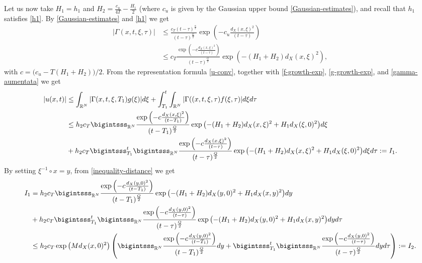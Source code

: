 \documentclass[11pt,a4paper]{article}
\numberwithin{equation}{section}
\def \rn {{\mathbb {R}}^{N}}
\def \a {{\alpha}}
\def \G {{\Gamma}}
\def \t {{\tau}}
\def \x {{\xi}}
\begin{document}
\begin{pf-fundamental}
	
	Let us now take  $H_1=h_1$ and $H_2=\frac{c_u}{4T}-\frac{H_1}{2}$ (where $c_u$ is given by the Gaussian upper bound \eqref{Gaussian-estimates}), and recall that $h_1$ satisfies \eqref{h1}. By \eqref{Gaussian-estimates} and \eqref{h1} we get 
	\begin{equation}\label{gamma-aumentata}
		\begin{aligned}
			|\G(x,t,\x,\t)|&\leq \frac{c_T (t-\tau)^{\frac{\a}{2}}}{(t-\t)^{\frac{Q}{2}}}\exp{\left(-c_u\frac{d_X(x,\x)^2}{(t-\t)}\right)}\\
			&\leq c_T\frac{\exp{\left(-c\frac{d_X(x,\x)^2}{(t-\t)}\right)}}{(t-\t)^{\frac{Q}{2}}}\exp{\left(-(H_1+H_2)d_X(x,\x)^2\right)},
		\end{aligned}
	\end{equation} 
	with $c = \big(c_u-T(H_1+H_2)\big)/2$. From the representation formula \eqref{u-conv}, together with \eqref{f-growth-exp}, \eqref{g-growth-exp}, and  \eqref{gamma-aumentata} we get
	\begin{equation}
		\begin{aligned}
			|u(x,t)|&\leq\int_{\rn}|\G(x,t,\xi,T_1)g(\xi)|d\xi + \int_{T_1}^t\int_{\rn}|\G((x,t,\xi,\tau)f(\xi,\tau)|d\xi d\tau\\
			&\leq h_2c_T \bigintsss_{\rn}\frac{\exp{\left(-c\frac{d_X(x,\x)^2}{(t-T_1)}\right)}}{(t-T_1)^{\frac{Q}{2}}}\exp{\left(-(H_1+H_2)d_X(x,\x)^2+H_1d_X(\x,0)^2\right)}d\xi \\
			&+h_2c_T\bigintsss_{T_1}^t\bigintsss_{\rn}\frac{\exp{\left(-c\frac{d_X(x,\x)^2}{(t-\t)}\right)}}{(t-\t)^{\frac{Q}{2}}}\exp{\left(-(H_1+H_2)d_X(x,\x)^2+H_1d_X(\x,0)^2\right)}d\xi d\t:=I_1.
		\end{aligned}
	\end{equation}
	By setting $\x^{-1}\circ x = y$, from \eqref{inequality-distance} we get
	\begin{equation}
		\begin{aligned}
		I_1&=h_2c_T\bigintsss_{\rn}\frac{\exp{\left(-c\frac{d_X(y,0)^2}{(t-T_1)}\right)}}{(t-T_1)^{\frac{Q}{2}}}\exp{\left(-(H_1+H_2)d_X(y,0)^2+H_1d_X(x,y)^2\right)}dy \\
		&+h_2c_T\bigintsss_{T_1}^t\bigintsss_{\rn}\frac{\exp{\left(-c\frac{d_X(y,0)^2}{(t-\t)}\right)}}{(t-\t)^{\frac{Q}{2}}}\exp{\left(-(H_1+H_2)d_X(y,0)^2+H_1d_X(x,y)^2\right)}dy d\t\\
		&\leq h_2c_T\exp\big({Md_X(x,0)^2}\big)\left(\bigintsss_{\rn}\frac{\exp{\left(-c\frac{d_X(y,0)^2}{(t-T_1)}\right)}}{(t-T_1)^{\frac{Q}{2}}}dy +\bigintsss_{T_1}^t\bigintsss_{\rn}\frac{\exp{\left(-c\frac{d_X(y,0)^2}{(t-\t)}\right)}}{(t-\t)^{\frac{Q}{2}}}dy d\t\right):=I_2.

\end{aligned}
\end{equation}
\end{pf-fundamental}
\end{document}
